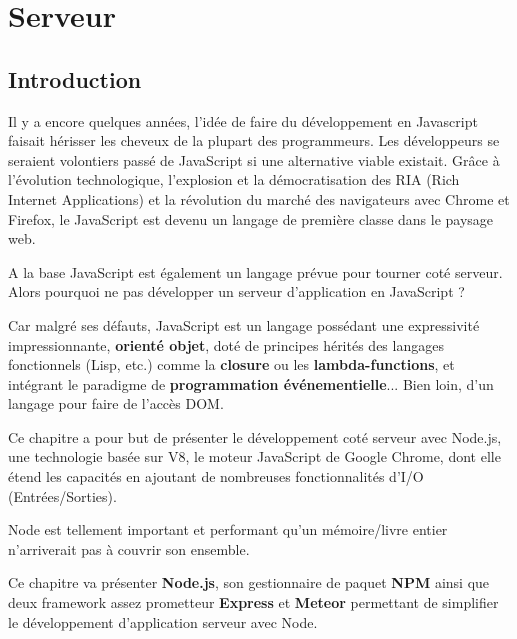 \chapter{Serveur}

\section{Introduction}
\label{ch:introServeur}



Il y a encore quelques années, l’idée de faire du développement en Javascript faisait hérisser les cheveux de la plupart des programmeurs. Les développeurs se seraient volontiers passé de JavaScript si une alternative viable existait. Grâce à l'évolution technologique, l'explosion et la démocratisation des RIA (Rich Internet Applications) et la révolution du marché des navigateurs avec Chrome et Firefox, le JavaScript est devenu un langage de première classe dans le paysage web.

A la base JavaScript est également un langage prévue pour tourner coté serveur. Alors pourquoi ne pas développer un serveur d’application en JavaScript ?

Car malgré ses défauts, JavaScript est un langage possédant une expressivité impressionnante, \textbf{orienté objet}, doté de principes hérités des langages fonctionnels (Lisp, etc.) comme la \textbf{closure} ou les \textbf{lambda-functions}, et intégrant le paradigme de \textbf{programmation événementielle}... Bien loin, d’un langage pour faire de l’accès DOM. 

Ce chapitre a pour but de présenter le développement coté serveur avec  Node.js, une technologie basée sur V8, le moteur JavaScript de Google Chrome, dont elle étend les capacités en ajoutant de nombreuses fonctionnalités d'I/O (Entrées/Sorties).

Node est tellement important et performant qu’un mémoire/livre entier n’arriverait pas à couvrir son ensemble.

Ce chapitre va présenter \textbf{Node.js}, son gestionnaire de paquet \textbf{NPM} ainsi que deux framework assez prometteur \textbf{Express} et \textbf{Meteor} permettant de simplifier le développement d’application serveur avec Node.
